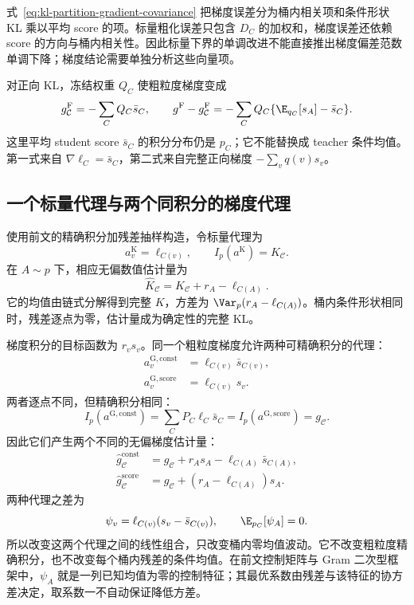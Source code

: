 式~\eqref{eq:kl-partition-gradient-covariance} 把梯度误差分为桶内相关项和条件形状 KL 乘以平均 score 的项。标量粗化误差只包含 $D_C$ 的加权和，梯度误差还依赖 score 的方向与桶内相关性。因此标量下界的单调改进不能直接推出梯度偏差范数单调下降；梯度结论需要单独分析这些向量项。

对正向 KL，冻结权重 $Q_C$ 使粗粒度梯度变成
\[
 g^{\mathrm F}_{\mathcal C}=-\sum_CQ_C\bar s_C,
 \qquad
 g^{\mathrm F}-g^{\mathrm F}_{\mathcal C}
 =-\sum_CQ_C\{\E_{q_C}[s_A]-\bar s_C\}.
\]
这里平均 student score $\bar s_C$ 的积分分布仍是 $p_C$；它不能替换成 teacher 条件均值。第一式来自 $\nabla\ell_C=\bar s_C$，第二式来自完整正向梯度 $-\sum_vq(v)s_v$。

\subsection{一个标量代理与两个同积分的梯度代理}

使用前文的精确积分加残差抽样构造，令标量代理为
\[
 a^{\mathrm K}_v=\ell_{C(v)},\qquad
 I_p(a^{\mathrm K})=K_{\mathcal C}.
\]
在 $A\sim p$ 下，相应无偏数值估计量为
\[
 \widehat K_{\mathcal C}
 =K_{\mathcal C}+r_A-\ell_{C(A)}.
\]
它的均值由链式分解得到完整 $K$，方差为 $\Var_p(r_A-\ell_{C(A)})$。桶内条件形状相同时，残差逐点为零，估计量成为确定性的完整 KL。

梯度积分的目标函数为 $r_vs_v$。同一个粗粒度梯度允许两种可精确积分的代理：
\begin{align*}
 a^{\mathrm{G,const}}_v&=\ell_{C(v)}\bar s_{C(v)},\\
 a^{\mathrm{G,score}}_v&=\ell_{C(v)}s_v.
\end{align*}
两者逐点不同，但精确积分相同：
\[
 I_p(a^{\mathrm{G,const}})
 =\sum_CP_C\ell_C\bar s_C
 =I_p(a^{\mathrm{G,score}})=g_{\mathcal C}.
\]
因此它们产生两个不同的无偏梯度估计量：
\begin{align}
 \widehat g_{\mathcal C}^{\mathrm{const}}
 &=g_{\mathcal C}+r_As_A-\ell_{C(A)}\bar s_{C(A)},
 \label{eq:kl-partition-constant-estimator}\\
 \widehat g_{\mathcal C}^{\mathrm{score}}
 &=g_{\mathcal C}+(r_A-\ell_{C(A)})s_A.
 \label{eq:kl-partition-score-estimator}
\end{align}
两种代理之差为
\[
 \psi_v=\ell_{C(v)}(s_v-\bar s_{C(v)}),
 \qquad \E_{p_C}[\psi_A]=0.
\]
所以改变这两个代理之间的线性组合，只改变桶内零均值波动。它不改变粗粒度精确积分，也不改变每个桶内残差的条件均值。在前文控制矩阵与 Gram 二次型框架中，$\psi_A$ 就是一列已知均值为零的控制特征；其最优系数由残差与该特征的协方差决定，取系数一不自动保证降低方差。

